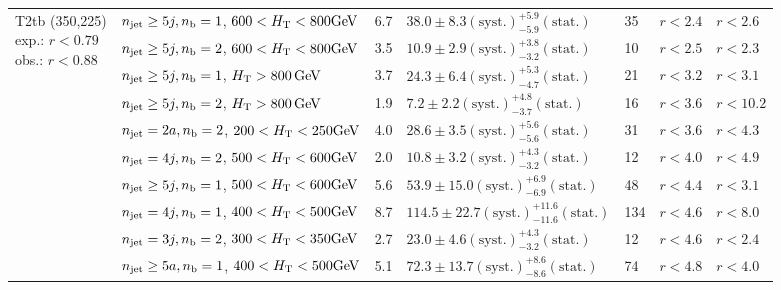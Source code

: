 \begin{table}[h!]
\begin{tabular}{ lllllll }
\multirow{10}{*}{\parbox[t]{2cm}{T2tb (350,225)\\exp.: $r<0.79$\\obs.: $r<0.88$}}
 & $n_{\mathrm{jet}} \geq5j,n_{\text{b}} =1$, $600 < \mbox{$H_\text{T}$} < 800 \mathrm{GeV}$ & 6.7 & $38.0 \pm 8.3 \mathrm{(syst.)} ^{+5.9}_{-5.9} \mathrm{(stat.)}$ & 35 & $r < 2.4$ & $r < 2.6$\\ 
 & $n_{\mathrm{jet}} \geq5j,n_{\text{b}} =2$, $600 < \mbox{$H_\text{T}$} < 800 \mathrm{GeV}$ & 3.5 & $10.9 \pm 2.9 \mathrm{(syst.)} ^{+3.8}_{-3.2} \mathrm{(stat.)}$ & 10 & $r < 2.5$ & $r < 2.3$\\ 
 & $n_{\mathrm{jet}} \geq5j,n_{\text{b}} =1$, $\mbox{$H_\text{T}$} > 800 \, \mathrm{GeV}$ & 3.7 & $24.3 \pm 6.4 \mathrm{(syst.)} ^{+5.3}_{-4.7} \mathrm{(stat.)}$ & 21 & $r < 3.2$ & $r < 3.1$\\ 
 & $n_{\mathrm{jet}} \geq5j,n_{\text{b}} =2$, $\mbox{$H_\text{T}$} > 800 \, \mathrm{GeV}$ & 1.9 & $7.2 \pm 2.2 \mathrm{(syst.)} ^{+4.8}_{-3.7} \mathrm{(stat.)}$ & 16 & $r < 3.6$ & $r < 10.2$\\ 
 & $n_{\mathrm{jet}} =2a,n_{\text{b}} =2$, $200 < \mbox{$H_\text{T}$} < 250 \mathrm{GeV}$ & 4.0 & $28.6 \pm 3.5 \mathrm{(syst.)} ^{+5.6}_{-5.6} \mathrm{(stat.)}$ & 31 & $r < 3.6$ & $r < 4.3$\\ 
 & $n_{\mathrm{jet}} =4j,n_{\text{b}} =2$, $500 < \mbox{$H_\text{T}$} < 600 \mathrm{GeV}$ & 2.0 & $10.8 \pm 3.2 \mathrm{(syst.)} ^{+4.3}_{-3.2} \mathrm{(stat.)}$ & 12 & $r < 4.0$ & $r < 4.9$\\ 
 & $n_{\mathrm{jet}} \geq5j,n_{\text{b}} =1$, $500 < \mbox{$H_\text{T}$} < 600 \mathrm{GeV}$ & 5.6 & $53.9 \pm 15.0 \mathrm{(syst.)} ^{+6.9}_{-6.9} \mathrm{(stat.)}$ & 48 & $r < 4.4$ & $r < 3.1$\\ 
 & $n_{\mathrm{jet}} =4j,n_{\text{b}} =1$, $400 < \mbox{$H_\text{T}$} < 500 \mathrm{GeV}$ & 8.7 & $114.5 \pm 22.7 \mathrm{(syst.)} ^{+11.6}_{-11.6} \mathrm{(stat.)}$ & 134 & $r < 4.6$ & $r < 8.0$\\ 
 & $n_{\mathrm{jet}} =3j,n_{\text{b}} =2$, $300 < \mbox{$H_\text{T}$} < 350 \mathrm{GeV}$ & 2.7 & $23.0 \pm 4.6 \mathrm{(syst.)} ^{+4.3}_{-3.2} \mathrm{(stat.)}$ & 12 & $r < 4.6$ & $r < 2.4$\\ 
 & $n_{\mathrm{jet}} \geq5a,n_{\text{b}} =1$, $400 < \mbox{$H_\text{T}$} < 500 \mathrm{GeV}$ & 5.1 & $72.3 \pm 13.7 \mathrm{(syst.)} ^{+8.6}_{-8.6} \mathrm{(stat.)}$ & 74 & $r < 4.8$ & $r < 4.0$\\ \hline
    \hline
  \end{tabular}
\end{table}

